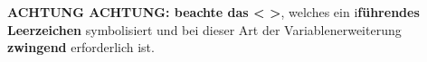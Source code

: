 \textbf{ACHTUNG ACHTUNG: beachte das < >}, welches ein i\textbf{führendes
Leerzeichen} symbolisiert und bei dieser Art der Variablenerweiterung
\textbf{zwingend} erforderlich ist.







%
%
%
%
%
%
%
%
%
%
%
%
%
%
%
%
%
%
%
%
%
%
%
%
%
%
%
%
%
%
%
%
%
%
%
%



